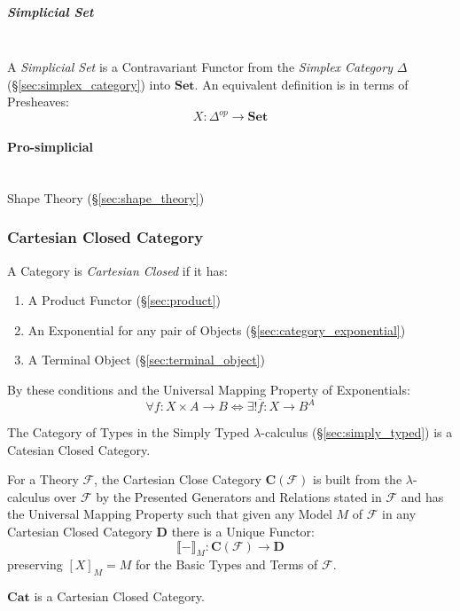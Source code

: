 \subparagraph{Simplicial Set}\label{sec:simplicial_set}
\hfill \\

A \emph{Simplicial Set} is a Contravariant Functor from the
\emph{Simplex Category} $\Delta$ (\S\ref{sec:simplex_category}) into
$\mathbf{Set}$. An equivalent definition is in terms of Presheaves:
\[
  X: \Delta^{op} \rightarrow \mathbf{Set}
\]



\paragraph{Pro-simplicial}\label{sec:pro_simplicial}
\hfill \\

Shape Theory (\S\ref{sec:shape_theory})



\subsubsection{Cartesian Closed Category}\label{sec:cartesian_closed}

A Category is \emph{Cartesian Closed} if it has:
\begin{enumerate}
\item A Product Functor (\S\ref{sec:product})
\item An Exponential for any pair of Objects
  (\S\ref{sec:category_exponential})
\item A Terminal Object (\S\ref{sec:terminal_object})
\end{enumerate}
By these conditions and the Universal Mapping Property of
Exponentials:
\[
  \forall f : X \times A \rightarrow B \Leftrightarrow
  \exists ! \overline{f} : X \rightarrow B^A
\]

The Category of Types in the Simply Typed $\lambda$-calculus
(\S\ref{sec:simply_typed}) is a Catesian Closed Category.

For a Theory $\mathcal{F}$, the Cartesian Close Category
$\mathbf{C}(\mathcal{F})$ is built from the $\lambda$-calculus over
$\mathcal{F}$ by the Presented Generators and Relations stated in
$\mathcal{F}$ and has the Universal Mapping Property such that given
any Model $M$ of $\mathcal{F}$ in any Cartesian Closed Category
$\mathbf{D}$ there is a Unique Functor:
\[
  \llbracket - \rrbracket_M :
    \mathbf{C}(\mathcal{F}) \rightarrow \mathbf{D}
\]
preserving $[X]_M = M$ for the Basic Types and Terms of $\mathcal{F}$.
\cite{awodey06}

$\mathbf{Cat}$ is a Cartesian Closed Category.

